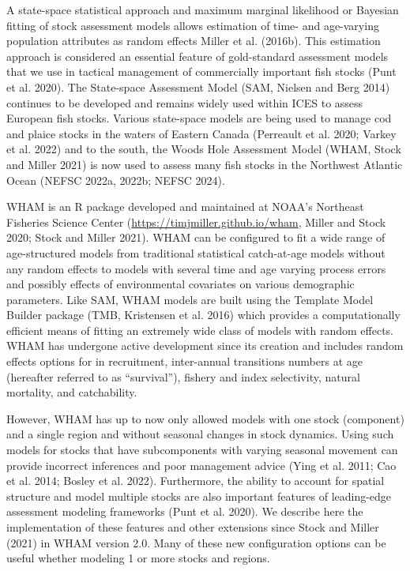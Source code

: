 \documentclass[
]{article}
\begin{document}
A state-space statistical approach and maximum marginal likelihood or
Bayesian fitting of stock assessment models allows estimation of time-
and age-varying population attributes as random effects Miller et al.
(2016b). This estimation approach is considered an essential feature of
gold-standard assessment models that we use in tactical management of
commercially important fish stocks (Punt et al. 2020). The State-space
Assessment Model (SAM, Nielsen and Berg 2014) continues to be developed
and remains widely used within ICES to assess European fish stocks.
Various state-space models are being used to manage cod and plaice
stocks in the waters of Eastern Canada (Perreault et al. 2020; Varkey et
al. 2022) and to the south, the Woods Hole Assessment Model (WHAM, Stock
and Miller 2021) is now used to assess many fish stocks in the Northwest
Atlantic Ocean (NEFSC 2022a, 2022b; NEFSC 2024).

WHAM is an R package developed and maintained at NOAA's Northeast
Fisheries Science Center (\url{https://timjmiller.github.io/wham},
Miller and Stock 2020; Stock and Miller 2021). WHAM can be configured to
fit a wide range of age-structured models from traditional statistical
catch-at-age models without any random effects to models with several
time and age varying process errors and possibly effects of
environmental covariates on various demographic parameters. Like SAM,
WHAM models are built using the Template Model Builder package (TMB,
Kristensen et al. 2016) which provides a computationally efficient means
of fitting an extremely wide class of models with random effects. WHAM
has undergone active development since its creation and includes random
effects options for in recruitment, inter-annual transitions numbers at
age (hereafter referred to as ``survival''), fishery and index
selectivity, natural mortality, and catchability.

However, WHAM has up to now only allowed models with one stock
(component) and a single region and without seasonal changes in stock
dynamics. Using such models for stocks that have subcomponents with
varying seasonal movement can provide incorrect inferences and poor
management advice (Ying et al. 2011; Cao et al. 2014; Bosley et al.
2022). Furthermore, the ability to account for spatial structure and
model multiple stocks are also important features of leading-edge
assessment modeling frameworks (Punt et al. 2020). We describe here the
implementation of these features and other extensions since Stock and
Miller (2021) in WHAM version 2.0. Many of these new configuration
options can be useful whether modeling 1 or more stocks and regions.
\end{document}
